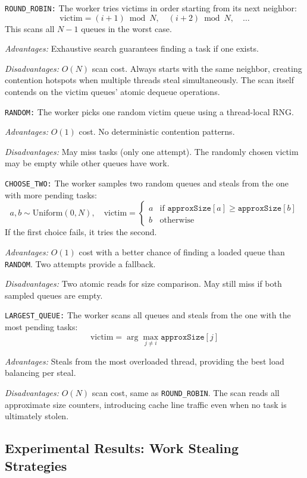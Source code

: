 \texttt{ROUND\_ROBIN:}
The worker tries victims in order starting from its next neighbor:
\[
    \text{victim} = (i+1) \bmod N, \quad (i+2) \bmod N, \quad \ldots
\]
This scans all $N-1$ queues in the worst case.

\textit{Advantages:} Exhaustive search guarantees finding a task if one exists.

\textit{Disadvantages:} $O(N)$ scan cost. Always starts with the same neighbor, creating contention hotspots when multiple threads steal simultaneously. The scan itself contends on the victim queues' atomic dequeue operations.

\texttt{RANDOM:}
The worker picks one random victim queue using a thread-local RNG.

\textit{Advantages:} $O(1)$ cost. No deterministic contention patterns.

\textit{Disadvantages:} May miss tasks (only one attempt). The randomly chosen victim may be empty while other queues have work.

\texttt{CHOOSE\_TWO:}
The worker samples two random queues and steals from the one with more pending tasks:
\[
    a, b \sim \text{Uniform}(0, N), \quad \text{victim} =
    \begin{cases}
        a & \text{if } \texttt{approxSize}[a] \geq \texttt{approxSize}[b] \\
        b & \text{otherwise}
    \end{cases}
\]
If the first choice fails, it tries the second.

\textit{Advantages:} $O(1)$ cost with a better chance of finding a loaded queue than \texttt{RANDOM}. Two attempts provide a fallback.

\textit{Disadvantages:} Two atomic reads for size comparison. May still miss if both sampled queues are empty.

\texttt{LARGEST\_QUEUE:}
The worker scans all queues and steals from the one with the most pending tasks:
\[
    \text{victim} = \arg\max_{j \neq i} \texttt{approxSize}[j]
\]

\textit{Advantages:} Steals from the most overloaded thread, providing the best load balancing per steal.

\textit{Disadvantages:} $O(N)$ scan cost, same as \texttt{ROUND\_ROBIN}. The scan reads all approximate size counters, introducing cache line traffic even when no task is ultimately stolen.

\subsection{Experimental Results: Work Stealing Strategies}
\label{sec:stealing-results}

